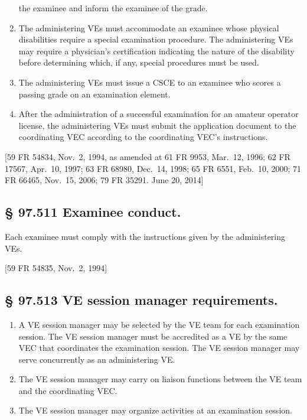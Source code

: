 \documentclass[
  letterpaper,
  DIV=11,
  numbers=noendperiod]{scrreport}
\begin{document}
\begin{enumerate}
  the examinee and inform the examinee of the grade.
\item
  The administering VEs must accommodate an examinee whose physical
  disabilities require a special examination procedure. The
  administering VEs may require a physician's certification indicating
  the nature of the disability before determining which, if any, special
  procedures must be used.
\item
  The administering VEs must issue a CSCE to an examinee who scores a
  passing grade on an examination element.
\item
  After the administration of a successful examination for an amateur
  operator license, the administering VEs must submit the application
  document to the coordinating VEC according to the coordinating VEC's
  instructions.
\end{enumerate}

{[}59 FR 54834, Nov.~2, 1994, as amended at 61 FR 9953, Mar.~12, 1996;
62 FR 17567, Apr.~10, 1997; 63 FR 68980, Dec.~14, 1998; 65 FR 6551,
Feb.~10, 2000; 71 FR 66465, Nov.~15, 2006; 79 FR 35291. June 20, 2014{]}

\hypertarget{examinee-conduct.}{%
\subsection*{§ 97.511 Examinee conduct.}\label{examinee-conduct.}}

Each examinee must comply with the instructions given by the
administering VEs.

{[}59 FR 54835, Nov.~2, 1994{]}

\hypertarget{ve-session-manager-requirements.}{%
\subsection*{§ 97.513 VE session manager
requirements.}\label{ve-session-manager-requirements.}}

\begin{enumerate}
\def\labelenumi{(\alph{enumi})}
\item
  A VE session manager may be selected by the VE team for each
  examination session. The VE session manager must be accredited as a VE
  by the same VEC that coordinates the examination session. The VE
  session manager may serve concurrently as an administering VE.
\item
  The VE session manager may carry on liaison functions between the VE
  team and the coordinating VEC.
\item
  The VE session manager may organize activities at an examination
  session.
\end{enumerate}
\end{document}
